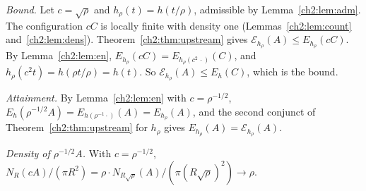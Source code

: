 \begin{humanproof}
\emph{Bound.} Let $c=\sqrt\rho$ and $h_\rho(t)=h(t/\rho)$, admissible by Lemma~\ref{ch2:lem:adm}. The configuration
$cC$ is locally finite with density one (Lemmas~\ref{ch2:lem:count} and~\ref{ch2:lem:dens}). Theorem~\ref{ch2:thm:upstream}
gives $\mathcal{E}_{h_\rho}(A)\le E_{h_\rho}(cC)$. By Lemma~\ref{ch2:lem:en},
$E_{h_\rho}(cC)=E_{h_\rho(c^2\,\cdot)}(C)$, and $h_\rho(c^2t)=h(\rho t/\rho)=h(t)$. So $\mathcal{E}_{h_\rho}(A)\le E_h(C)$,
which is the bound.

\emph{Attainment.} By Lemma~\ref{ch2:lem:en} with $c=\rho^{-1/2}$, $E_h(\rho^{-1/2}A)=E_{h(\rho^{-1}\cdot)}(A)=E_{h_\rho}(A)$,
and the second conjunct of Theorem~\ref{ch2:thm:upstream} for $h_\rho$ gives $E_{h_\rho}(A)=\mathcal{E}_{h_\rho}(A)$.

\emph{Density of $\rho^{-1/2}A$.} With $c=\rho^{-1/2}$, $N_R(cA)/(\pi R^2)=\rho\cdot N_{R\sqrt\rho}(A)/(\pi(R\sqrt\rho)^2)\to\rho$.
\end{humanproof}

